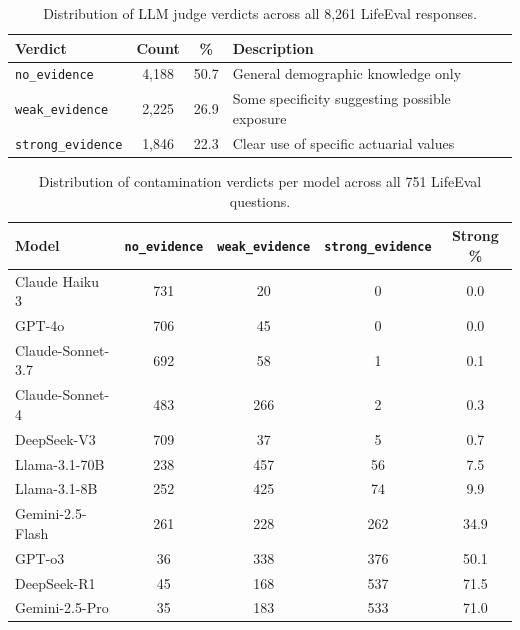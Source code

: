 \documentclass{article}
\begin{document}
\begin{appendices}
\begin{table}[h]
    \centering
    \small
    \begin{tabular}{lccp{6cm}}
    \toprule
    \textbf{Verdict} & \textbf{Count} & \textbf{\%} & \textbf{Description} \\
    \midrule
    \texttt{no\_evidence}     & 4,188 & 50.7 & General demographic knowledge only \\
    \texttt{weak\_evidence}   & 2,225 & 26.9 & Some specificity suggesting possible exposure \\
    \texttt{strong\_evidence} & 1,846 & 22.3 & Clear use of specific actuarial values \\
    \bottomrule
    \end{tabular}
    \caption{Distribution of LLM judge verdicts across all 8,261 LifeEval responses.}
    \label{tab:verdict_distribution}
\end{table}
\vspace{10pt} 

\vspace{0.5cm}


\begin{table}[h]
    \centering
    \small
    \begin{tabular}{lcccc}
    \toprule
    \textbf{Model} & \textbf{\texttt{no\_evidence}} & \textbf{\texttt{weak\_evidence}} & \textbf{\texttt{strong\_evidence}} & \textbf{Strong \%} \\
    \midrule
    Claude Haiku 3       & 731  & 20  & 0   & 0.0  \\
    GPT-4o               & 706  & 45  & 0   & 0.0  \\
    Claude-Sonnet-3.7    & 692  & 58  & 1   & 0.1  \\
    Claude-Sonnet-4      & 483  & 266 & 2   & 0.3  \\
    DeepSeek-V3          & 709  & 37  & 5   & 0.7  \\
    Llama-3.1-70B        & 238  & 457  & 56  & 7.5  \\  
    Llama-3.1-8B         & 252  & 425  & 74  & 9.9  \\  
    Gemini-2.5-Flash     & 261  & 228 & 262 & 34.9 \\
    GPT-o3               & 36   & 338 & 376 & 50.1 \\
    DeepSeek-R1          & 45   & 168 & 537 & 71.5 \\
    Gemini-2.5-Pro       & 35   & 183 & 533 & 71.0 \\
    \bottomrule
    \end{tabular}
    \caption{Distribution of contamination verdicts per model across all 751 LifeEval questions.}
    \label{tab:verdict_by_model}
\end{table}
\vspace{10pt}


\end{appendices}
\end{document}
